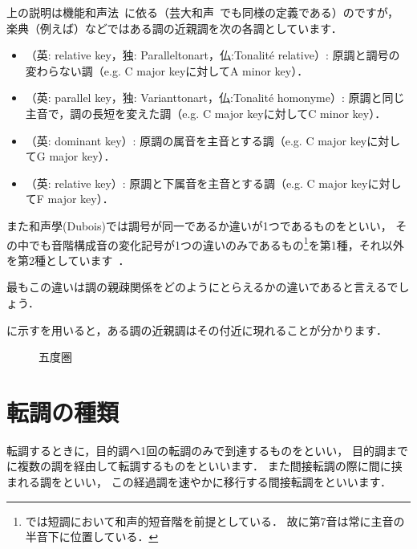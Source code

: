 \documentclass[dvipdfmx,uplatex,b5paper,openany,jbase=12Q,nomag*,textwidth-limit=44%
               ]{gachimuchi}
\begin{document}
\begin{Yodan}
上の説明は機能和声法~\cite{chMOROI1a}に依る（芸大和声~\cite[p.97]{chSHIMAOKA1ii}でも同様の定義である）のですが，
楽典（例えば\cite{mgKIKUCHI1}）などではある調の近親調を次の各調としています．
\begin{itemize}
  \item {}（英: relative key，独: Paralleltonart，仏:Tonalité relative）:
        原調と調号の変わらない調（e.g. C major keyに対してA minor key）．
  \item {}（英: parallel key，独: Varianttonart，仏:Tonalité homonyme）:
        原調と同じ主音で，調の長短を変えた調（e.g. C major keyに対してC minor key）．
  \item {}（英: dominant key）:
        原調の属音を主音とする調（e.g. C major keyに対してG major key）．
  \item {}（英: relative key）:
        原調と下属音を主音とする調（e.g. C major keyに対してF major key）．
\end{itemize}

また和声學(Dubois)では調号が同一であるか違いが1つであるものをといい，
その中でも音階構成音の変化記号が1つの違いのみであるもの\footnote{%
  では短調において和声的短音階を前提としている．
  故に第7音は常に主音の半音下に位置している．
}を第1種，それ以外を第2種としています~\cite[p.49]{chDUBOIS1}．

最もこの違いは調の親疎関係をどのようにとらえるかの違いであると言えるでしょう．
\end{Yodan}

に示すを用いると，ある調の近親調はその付近に現れることが分かります．
\begin{figure}[ht]
\begin{center}
  
  \caption{五度圏}
\end{center}
\end{figure}

\section{転調の種類}
転調するときに，目的調へ1回の転調のみで到達するものをといい，
目的調までに複数の調を経由して転調するものをといいます．
また間接転調の際に間に挟まれる調をといい，
この経過調を速やかに移行する間接転調をといいます．
\end{document}
